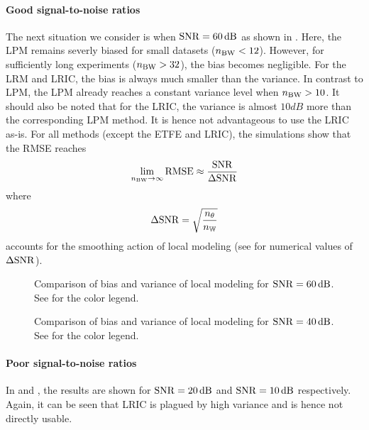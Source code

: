 \paragraph{Good signal-to-noise ratios}
The next situation we consider is when $\SNR=60\unit{dB}$ as shown in .
Here, the \gls{LPM} remains severly biased for small datasets ($n_{\mathrm{BW}} < 12$).
However, for sufficiently long experiments ($n_{\mathrm{BW}} > 32$), the bias becomes negligible.
For the \gls{LRM} and \gls{LRIC}, the bias is always much smaller than the variance.
In contrast to \gls{LPM}, the \gls{LPM} already reaches a constant variance level when $n_{\mathrm{BW}} > 10$.
It should also be noted that for the \gls{LRIC}, the variance is almost $10\unit{dB}$ more than the corresponding \gls{LPM} method.
It is hence not advantageous to use the \gls{LRIC} as-is.
For all methods (except the \gls{ETFE} and \gls{LRIC}), the simulations show that the \gls{RMSE} reaches
\begin{equation}
  \lim_{n_{\mathrm{BW}} \to \infty} \mathrm{RMSE} \approx \frac{\mathrm{SNR}}{\Delta \mathrm{SNR}}
\end{equation}
where
\begin{equation}
  \Delta\mathrm{SNR} = \sqrt{\frac{n_{\theta}}{n_{\mathbb{W}}}}
\end{equation}
accounts for the smoothing action of local modeling (see  for numerical values of $\Delta \mathrm{SNR}$).

\begin{figure}[p]
  \centering
  \setlength{\figurewidth}{0.85\columnwidth}
  \setlength{\figureheight}{0.62\figurewidth}
  
  \caption[Comparison of local models for $\SNR = 60 \unit{dB}$]{Comparison of bias and variance of local modeling for $\SNR=60\unit{dB}$. See  for the color legend.}
  \label{fig:nparam:comparison:hiSNR}
\end{figure}

\begin{figure}[p]
  \centering
  \setlength{\figurewidth}{0.85\columnwidth}
  \setlength{\figureheight}{0.62\figurewidth}
  
  \caption[Comparison of local models for $\SNR = 40 \unit{dB}$]{Comparison of bias and variance of local modeling for $\SNR=40\unit{dB}$. See  for the color legend.}
  \label{fig:nparam:comparison:hiSNR}
\end{figure}

\paragraph{Poor signal-to-noise ratios}
In  and , the results are shown for $\mathrm{SNR}=20\,\mathrm{dB}$ and $\mathrm{SNR}=10\,\mathrm{dB}$ respectively.
Again, it can be seen that \gls{LRIC} is plagued by high variance and is hence not directly usable.


